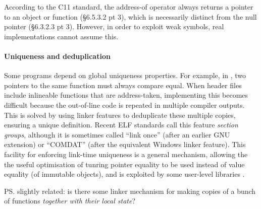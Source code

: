 According to the C11 standard, the address-of operator 
always returns a pointer to an object or function
(\S 6.5.3.2 pt 3), which is necessarily distinct from the null pointer
(\S6.3.2.3 pt 3).
However, in order to exploit weak symbols, real implementations
cannot assume this.

% 

\paragraph{Uniqueness and deduplication}
Some programs depend on global uniqueness properties. 
For example, in \Cplusplus{}, two pointers to the same function
must always compare equal.
When header files include inlineable functions that are address-taken, 
implementing this becomes difficult because the
out-of-line code is repeated in multiple compiler outputs.
This is solved by using linker features 
to deduplicate these multiple copies, ensuring a unique definition.
Recent ELF standards call this feature \emph{section groups},
although it is sometimes called ``link once'' (after an earlier GNU extension) or
``COMDAT'' (after the equivalent Windows linker feature).
This facility for enforcing link-time uniqueness 
is a general mechanism, allowing the 
the useful optimisation of tunring pointer equality to be used instead of value equality 
(of immutable objects),
and is exploited by some user-level libraries \citep{kell_towards_2015}.



\ps{slightly related: is there some linker mechanism for making copies
  of a bunch of functions \emph{together with their local state}?}

